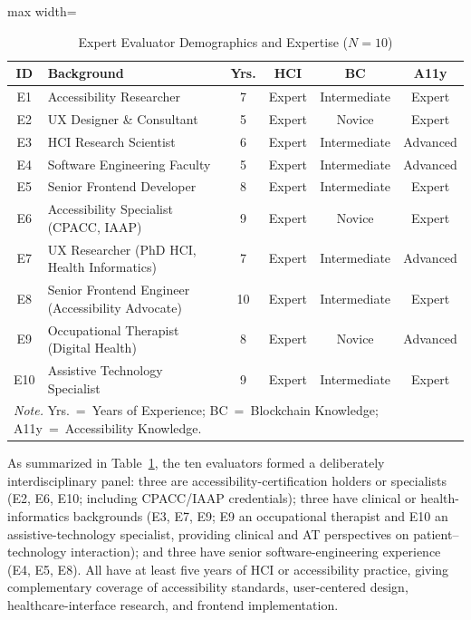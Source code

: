 \documentclass[journal,onecolumn]{IEEEtran}
\begin{document}
\begin{table}[htbp]
\centering
\caption{Expert Evaluator Demographics and Expertise ($N=10$)}
\label{tab:participants}
\small
\begin{adjustbox}{max width=\columnwidth}
\begin{tabular}{|c|p{2.4cm}|c|c|c|c|}
\hline
\textbf{ID} & \textbf{Background} & \textbf{Yrs.} & \textbf{HCI} & \textbf{BC} & \textbf{A11y} \\
\hline
E1 & Accessibility Researcher & 7 & Expert & Intermediate & Expert \\
\hline
E2 & UX Designer \& Consultant & 5 & Expert & Novice & Expert \\
\hline
E3 & HCI Research Scientist & 6 & Expert & Intermediate & Advanced \\
\hline
E4 & Software Engineering Faculty & 5 & Expert & Intermediate & Advanced \\
\hline
E5 & Senior Frontend Developer & 8 & Expert & Intermediate & Expert \\
\hline
E6 & Accessibility Specialist (CPACC, IAAP) & 9 & Expert & Novice & Expert \\
\hline
E7 & UX Researcher (PhD HCI, Health Informatics) & 7 & Expert & Intermediate & Advanced \\
\hline
E8 & Senior Frontend Engineer (Accessibility Advocate) & 10 & Expert & Intermediate & Expert \\
\hline
E9 & Occupational Therapist (Digital Health) & 8 & Expert & Novice & Advanced \\
\hline
E10 & Assistive Technology Specialist & 9 & Expert & Intermediate & Expert \\
\hline
\multicolumn{6}{l}{\footnotesize\textit{Note.} Yrs.~=~Years of Experience;
BC~=~Blockchain Knowledge; A11y~=~Accessibility Knowledge.}
\end{tabular}
\end{adjustbox}
\end{table}

As summarized in Table~\ref{tab:participants}, the ten evaluators formed a deliberately interdisciplinary panel: three are accessibility-certification holders or specialists (E2, E6, E10; including CPACC/IAAP credentials); three have clinical or health-informatics backgrounds (E3, E7, E9; E9 an occupational therapist and E10 an assistive-technology specialist, providing clinical and AT perspectives on patient--technology interaction); and three have senior software-engineering experience (E4, E5, E8). All have at least five years of HCI or accessibility practice, giving complementary coverage of accessibility standards, user-centered design, healthcare-interface research, and frontend implementation.
\end{document}
